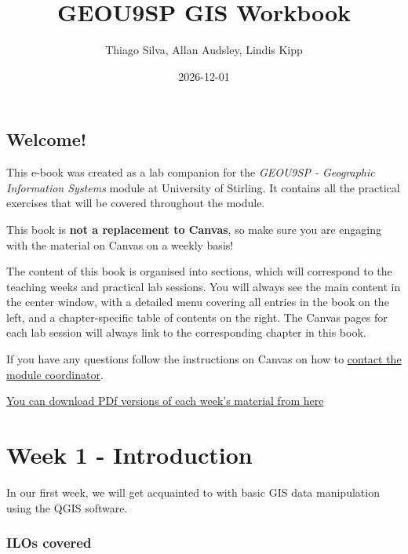 \documentclass[
  letterpaper,
  DIV=11,
  numbers=noendperiod]{scrreprt}
\title{GEOU9SP GIS Workbook}
\author{Thiago Silva, Allan Audsley, Lindis Kipp}
\date{2026-12-01}
\renewcommand*\contentsname{Table of contents}
\newcommand\contentsname{Table of contents}
\begin{document}
\maketitle

\renewcommand*\contentsname{Table of contents}
{
\hypersetup{linkcolor=}
\setcounter{tocdepth}{2}
\tableofcontents
}

\chapter*{Welcome!}\label{welcome}


This e-book was created as a lab companion for the \emph{GEOU9SP -
Geographic Information Systems} module at University of Stirling. It
contains all the practical exercises that will be covered throughout the
module.

This book is \textbf{not a replacement to Canvas}, so make sure you are
engaging with the material on Canvas on a weekly basis!

The content of this book is organised into sections, which will
correspond to the teaching weeks and practical lab sessions. You will
always see the main content in the center window, with a detailed menu
covering all entries in the book on the left, and a chapter-specific
table of contents on the right. The Canvas pages for each lab session
will always link to the corresponding chapter in this book.

If you have any questions follow the instructions on Canvas on how to
\href{}{contact the module coordinator}.

\href{https://stir-my.sharepoint.com/:f:/g/personal/ala2_stir_ac_uk/EsP4F6F1Cq9AmT49tSHyTeUByKL4zoPEdZ4zvwGnJZF68A?e=77wlDJ}{You
can download PDf versions of each week's material from here}

\part{Week 1 - Introduction}

In our first week, we will get acquainted to with basic GIS data
manipulation using the QGIS software.

\section*{ILOs covered}\label{ilos-covered}
\end{document}
